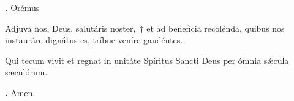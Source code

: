 \textbf{\Vbar.} Orémus

Adjuva nos, Deus, salutáris noster,~† et ad benefícia recolénda, quibus nos instauráre dignátus es, tríbue veníre gaudéntes.

Qui tecum vivit et regnat in unitáte Spíritus Sancti Deus per ómnia s\'{\ae}cula sæculórum.

\textbf{\Rbar.} Amen.

